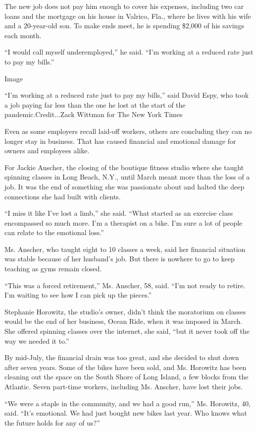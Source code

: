 The new job does not pay him enough to cover his expenses, including two
car loans and the mortgage on his house in Valrico, Fla., where he lives
with his wife and a 20-year-old son. To make ends meet, he is spending
\$2,000 of his savings each month.

``I would call myself underemployed,'' he said. ``I'm working at a
reduced rate just to pay my bills.''

Image

``I'm working at a reduced rate just to pay my bills,'' said David Espy,
who took a job paying far less than the one he lost at the start of the
pandemic.Credit...Zack Wittman for The New York Times

Even as some employers recall laid-off workers, others are concluding
they can no longer stay in business. That has caused financial and
emotional damage for owners and employees alike.

For Jackie Anscher, the closing of the boutique fitness studio where she
taught spinning classes in Long Beach, N.Y., until March meant more than
the loss of a job. It was the end of something she was passionate about
and halted the deep connections she had built with clients.

``I miss it like I've lost a limb,'' she said. ``What started as an
exercise class encompassed so much more. I'm a therapist on a bike. I'm
sure a lot of people can relate to the emotional loss.''

Ms. Anscher, who taught eight to 10 classes a week, said her financial
situation was stable because of her husband's job. But there is nowhere
to go to keep teaching as gyms remain closed.

``This was a forced retirement,'' Ms. Anscher, 58, said. ``I'm not ready
to retire. I'm waiting to see how I can pick up the pieces.''

Stephanie Horowitz, the studio's owner, didn't think the moratorium on
classes would be the end of her business, Ocean Ride, when it was
imposed in March. She offered spinning classes over the internet, she
said, ``but it never took off the way we needed it to.''

By mid-July, the financial drain was too great, and she decided to shut
down after seven years. Some of the bikes have been sold, and Ms.
Horowitz has been cleaning out the space on the South Shore of Long
Island, a few blocks from the Atlantic. Seven part-time workers,
including Ms. Anscher, have lost their jobs.

``We were a staple in the community, and we had a good run,'' Ms.
Horowitz, 40, said. ``It's emotional. We had just bought new bikes last
year. Who knows what the future holds for any of us?''

